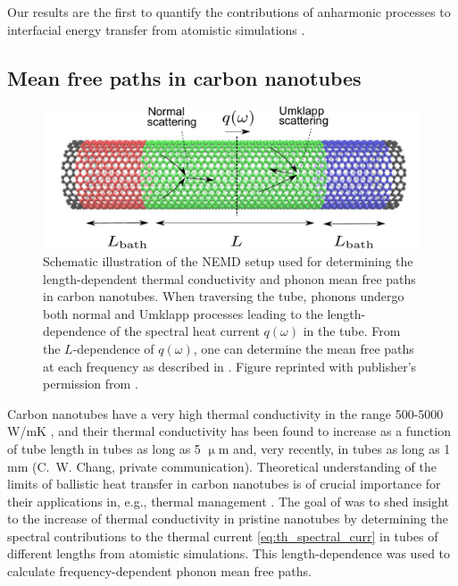 Our results are the first to quantify the contributions of anharmonic processes to interfacial energy transfer from atomistic simulations . 

\subsection{Mean free paths in carbon nanotubes}

\label{sec:results_mfps}

\begin{figure}[tb]
 \begin{center}
  \includegraphics[width=.89\columnwidth]{pics/cnt_fig1-crop.pdf} 
  \caption{Schematic illustration of the NEMD setup used for determining the length-dependent thermal conductivity and phonon mean free paths in carbon nanotubes. When traversing the tube, phonons undergo both normal and Umklapp processes leading to the length-dependence of the spectral heat current $q(\omega)$ in the tube. From the $L$-dependence of $q(\omega)$, one can determine the mean free paths at each frequency as described in . Figure reprinted with publisher's permission from .}  
\label{fig:cnt_fig1}
 \end{center}
\end{figure}

Carbon nanotubes have a very high thermal conductivity in the range 500-5000 W/mK \cite{}, and their thermal conductivity has been found to increase as a function of tube length in tubes as long as 5 $\upmu$m and, very recently, in tubes as long as 1 mm (C.~W. Chang, private communication). Theoretical understanding of the limits of ballistic heat transfer in carbon nanotubes is of crucial importance for their applications in, e.g., thermal management \cite{}. The goal of  was to shed insight to the increase of thermal conductivity in pristine nanotubes by determining the spectral contributions to the thermal current \eqref{eq:th_spectral_curr} in tubes of different lengths from atomistic simulations. This length-dependence was used to calculate frequency-dependent phonon mean free paths. %

